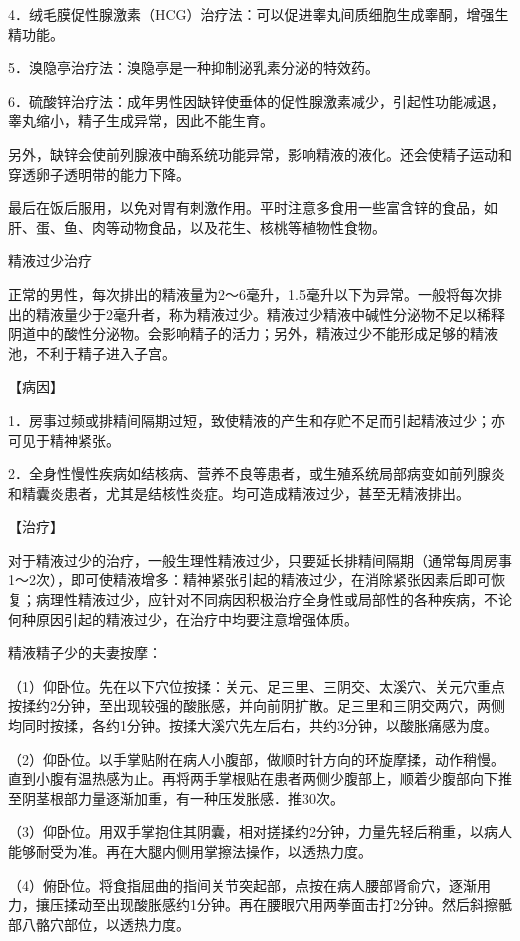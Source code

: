 \documentclass[12pt,UTF8]{ctexbook}
\begin{document}
4．绒毛膜促性腺激素（HCG）治疗法：可以促进睾丸间质细胞生成睾酮，增强生精功能。

5．溴隐亭治疗法：溴隐亭是一种抑制泌乳素分泌的特效药。

6．硫酸锌治疗法：成年男性因缺锌使垂体的促性腺激素减少，引起性功能减退，睾丸缩小，精子生成异常，因此不能生育。

另外，缺锌会使前列腺液中酶系统功能异常，影响精液的液化。还会使精子运动和穿透卵子透明带的能力下降。

最后在饭后服用，以免对胃有刺激作用。平时注意多食用一些富含锌的食品，如肝、蛋、鱼、肉等动物食品，以及花生、核桃等植物性食物。





精液过少治疗


正常的男性，每次排出的精液量为2～6毫升，1.5毫升以下为异常。一般将每次排出的精液量少于2毫升者，称为精液过少。精液过少精液中碱性分泌物不足以稀释阴道中的酸性分泌物。会影响精子的活力；另外，精液过少不能形成足够的精液池，不利于精子进入子宫。

【病因】

1．房事过频或排精间隔期过短，致使精液的产生和存贮不足而引起精液过少；亦可见于精神紧张。

2．全身性慢性疾病如结核病、营养不良等患者，或生殖系统局部病变如前列腺炎和精囊炎患者，尤其是结核性炎症。均可造成精液过少，甚至无精液排出。

【治疗】

对于精液过少的治疗，一般生理性精液过少，只要延长排精间隔期（通常每周房事1～2次），即可使精液增多：精神紧张引起的精液过少，在消除紧张因素后即可恢复；病理性精液过少，应针对不同病因积极治疗全身性或局部性的各种疾病，不论何种原因引起的精液过少，在治疗中均要注意增强体质。

精液精子少的夫妻按摩：

（1）仰卧位。先在以下穴位按揉：关元、足三里、三阴交、太溪穴、关元穴重点按揉约2分钟，至出现较强的酸胀感，并向前阴扩散。足三里和三阴交两穴，两侧均同时按揉，各约1分钟。按揉大溪穴先左后右，共约3分钟，以酸胀痛感为度。

（2）仰卧位。以手掌贴附在病人小腹部，做顺时针方向的环旋摩揉，动作稍慢。直到小腹有温热感为止。再将两手掌根贴在患者两侧少腹部上，顺着少腹部向下推至阴茎根部力量逐渐加重，有一种压发胀感．推30次。

（3）仰卧位。用双手掌抱住其阴囊，相对搓揉约2分钟，力量先轻后稍重，以病人能够耐受为准。再在大腿内侧用掌擦法操作，以透热力度。

（4）俯卧位。将食指屈曲的指间关节突起部，点按在病人腰部肾俞穴，逐渐用力，攘压揉动至出现酸胀感约1分钟。再在腰眼穴用两拳面击打2分钟。然后斜擦骶部八骼穴部位，以透热力度。
\end{document}
